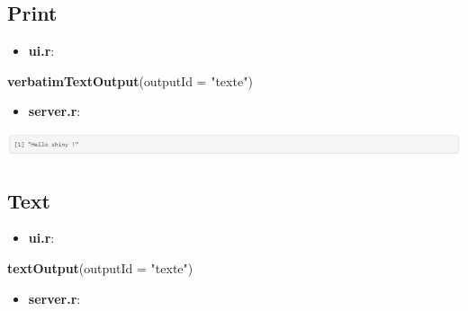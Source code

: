 \documentclass[]{article}
\newenvironment{Shaded}{\begin{snugshade}}{\end{snugshade}}
\newcommand{\KeywordTok}[1]{\textcolor[rgb]{0.13,0.29,0.53}{\textbf{#1}}}
\newcommand{\DataTypeTok}[1]{\textcolor[rgb]{0.13,0.29,0.53}{#1}}
\newcommand{\StringTok}[1]{\textcolor[rgb]{0.31,0.60,0.02}{#1}}
\newcommand{\OperatorTok}[1]{\textcolor[rgb]{0.81,0.36,0.00}{\textbf{#1}}}
\newcommand{\NormalTok}[1]{#1}
\providecommand{\tightlist}{%
  \setlength{\itemsep}{0pt}\setlength{\parskip}{0pt}}
\begin{document}
\subsection{Print}\label{print}

\begin{itemize}
\tightlist
\item
  \textbf{ui.r}:
\end{itemize}

\begin{Shaded}
\begin{Highlighting}[]
\KeywordTok{verbatimTextOutput}\NormalTok{(}\DataTypeTok{outputId =} \StringTok{"texte"}\NormalTok{)}
\end{Highlighting}
\end{Shaded}

\begin{itemize}
\tightlist
\item
  \textbf{server.r}:
\end{itemize}

\begin{Shaded}
\end{Shaded}

\includegraphics{img/otext.png}

\subsection{Text}\label{text}

\begin{itemize}
\tightlist
\item
  \textbf{ui.r}:
\end{itemize}

\begin{Shaded}
\begin{Highlighting}[]
\KeywordTok{textOutput}\NormalTok{(}\DataTypeTok{outputId =} \StringTok{"texte"}\NormalTok{)}
\end{Highlighting}
\end{Shaded}

\begin{itemize}
\tightlist
\item
  \textbf{server.r}:
\end{itemize}
\end{document}
